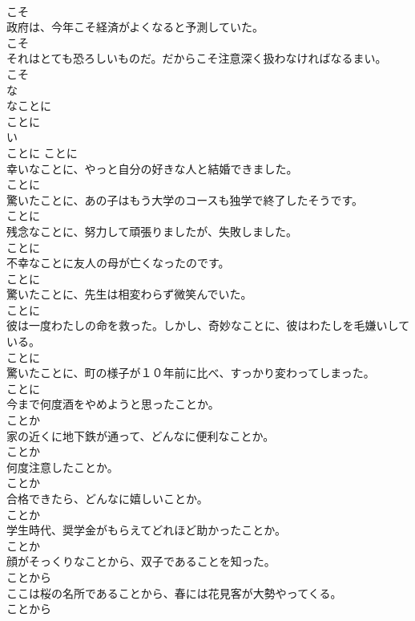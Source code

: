 \documentclass[8pt]{extreport}
\begin{document}
\begin{CJK}{UTF8}{min}
\\	こそ	
\\	政府は、今年こそ経済がよくなると予測していた。	
\\	こそ	
\\	それはとても恐ろしいものだ。だからこそ注意深く扱わなければなるまい。	
\\	こそ	
\\	な
\\	なことに	
\\	ことに	
\\	い
\\	ことに	ことに	
\\	幸いなことに、やっと自分の好きな人と結婚できました。	
\\	ことに	
\\	驚いたことに、あの子はもう大学のコースも独学で終了したそうです。	
\\	ことに	
\\	残念なことに、努力して頑張りましたが、失敗しました。	
\\	ことに	
\\	不幸なことに友人の母が亡くなったのです。	
\\	ことに	
\\	驚いたことに、先生は相変わらず微笑んでいた。	
\\	ことに	
\\	彼は一度わたしの命を救った。しかし、奇妙なことに、彼はわたしを毛嫌いしている。	
\\	ことに	
\\	驚いたことに、町の様子が１０年前に比べ、すっかり変わってしまった。	
\\	ことに	
\\	今まで何度酒をやめようと思ったことか。	
\\	ことか	
\\	家の近くに地下鉄が通って、どんなに便利なことか。	
\\	ことか	
\\	何度注意したことか。	
\\	ことか	
\\	合格できたら、どんなに嬉しいことか。	
\\	ことか	
\\	学生時代、奨学金がもらえてどれほど助かったことか。	
\\	ことか	
\\	顔がそっくりなことから、双子であることを知った。	
\\	ことから	
\\	ここは桜の名所であることから、春には花見客が大勢やってくる。	
\\	ことから	

\end{CJK}
\end{document}
